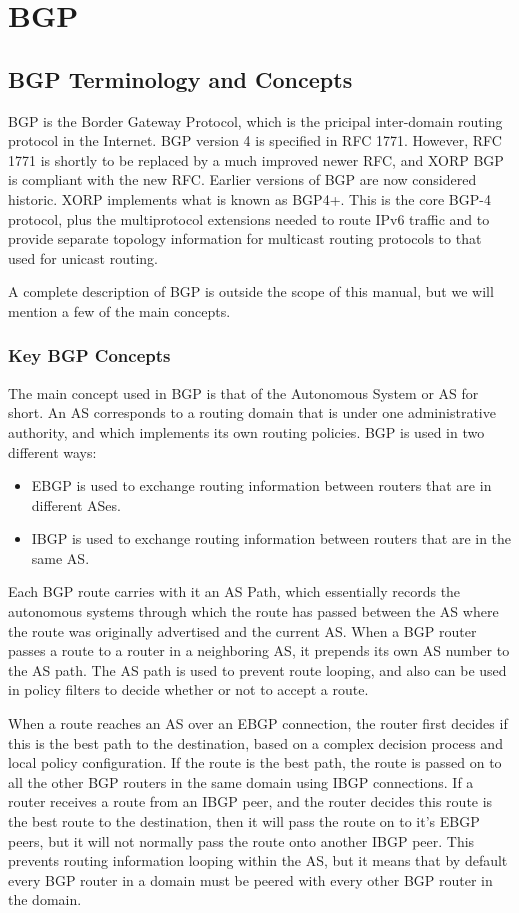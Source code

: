 \chapter{BGP}
\label{bgp}
\section{BGP Terminology and Concepts}

BGP is the Border Gateway Protocol, which is the pricipal inter-domain
routing protocol in the Internet.  BGP version 4 is specified in RFC
1771.  However, RFC 1771 is shortly to be replaced by a much improved
newer RFC, and XORP BGP is compliant with the new RFC.  Earlier
versions of BGP are now considered historic.  XORP implements what is
known as BGP4+.  This is the core BGP-4 protocol, plus the
multiprotocol extensions needed to route IPv6 traffic and to provide
separate topology information for multicast routing protocols to that
used for unicast routing.

A complete description of BGP is outside the scope of this manual, but
we will mention a few of the main concepts.  

\subsection{Key BGP Concepts}

The main concept used in BGP is that of the Autonomous System or AS
for short.  An AS corresponds to a routing domain that is under one
administrative authority, and which implements its own routing
policies.  BGP is used in two different ways:
\begin{itemize}
\item EBGP is used to exchange routing information between routers
that are in different ASes.
\item IBGP is used to exchange routing information between routers
that are in the same AS.
\end{itemize}
Each BGP route carries with it an AS Path, which essentially records
the autonomous systems through which the route has passed between the
AS where the route was originally advertised and the current AS.  When
a BGP router passes a route to a router in a neighboring AS, it
prepends its own AS number to the AS path.  The AS path is used to
prevent route looping, and also can be used in policy filters to
decide whether or not to accept a route.

When a route reaches an AS over an EBGP connection, the router first
decides if this is the best path to the destination, based on a
complex decision process and local policy configuration.  If the route
is the best path, the route is passed on to all the other BGP routers
in the same domain using IBGP connections.  If a router receives a
route from an IBGP peer, and the router decides this route is the best
route to the destination, then it will pass the route on to it's EBGP
peers, but it will not normally pass the route onto another IBGP peer.
This prevents routing information looping within the AS, but it means
that by default every BGP router in a domain must be peered with every
other BGP router in the domain.  

